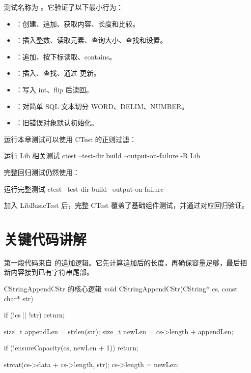 测试名称为 。它验证了以下最小行为：

\begin{itemize}
  \item {}：创建、追加、获取内容、长度和比较。
  \item {}：插入整数、读取元素、查询大小、查找和设置。
  \item {}：追加、按下标读取、contains。
  \item {}：插入、查找、通过  更新。
  \item {}：写入 int、flip 后读回。
  \item {}：对简单 SQL 文本切分 WORD、DELIM、NUMBER。
  \item {}：旧错误对象默认初始化。
\end{itemize}

运行本章测试可以使用 CTest 的正则过滤：

\begin{dbcode}[listing options={language=bash,numbers=none}]{运行 Lib 相关测试}
ctest --test-dir build --output-on-failure -R Lib
\end{dbcode}

完整回归测试仍然使用：

\begin{dbcode}[listing options={language=bash,numbers=none}]{运行完整测试}
ctest --test-dir build --output-on-failure
\end{dbcode}

加入 LibBasicTest 后，完整 CTest 覆盖了基础组件测试，并通过对应回归验证。

\section{关键代码讲解}
\label{sec:lib-code}

第一段代码来自  的追加逻辑。它先计算追加后的长度，再确保容量足够，最后把新内容接到已有字符串尾部。

\begin{dbcode}{CStringAppendCStr 的核心逻辑}
void CStringAppendCStr(CString* cs, const char* str) {
    if (!cs || !str) return;

    size_t appendLen = strlen(str);
    size_t newLen = cs->length + appendLen;

    if (!ensureCapacity(cs, newLen + 1)) return;

    strcat(cs->data + cs->length, str);
    cs->length = newLen;
}
\end{dbcode}

